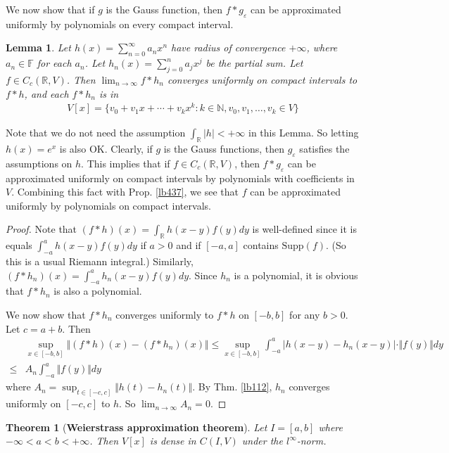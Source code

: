 \documentclass[12pt,b5paper,notitlepage]{article}
\theoremstyle{definition}
\theoremstyle{plain}
\newtheorem{thm}[df]{Theorem}
\newtheorem{lm}[df]{Lemma}
\newcommand{\Nbb}{\mathbb N}
\newcommand{\Rbb}{\mathbb R}
\newcommand{\Supp}{\mathrm{Supp}}
\newcommand{\Fbb}{\mathbb F}
\newcommand{\eps}{\varepsilon}
\numberwithin{equation}{section}
\begin{document}
We now show that if $g$ is the Gauss function, then $f*g_\eps$ can be approximated uniformly by polynomials on every compact interval. 

\begin{lm}\label{lb438}
Let $h(x)=\sum_{n=0}^\infty a_nx^n$ have radius of convergence $+\infty$, where $a_n\in\Fbb$ for each $a_n$. Let $h_n(x)=\sum_{j=0}^n a_jx^j$ be the partial sum. Let $f\in C_c(\Rbb,V)$. Then $\lim_{n\rightarrow\infty}f*h_n$ converges uniformly on compact intervals to $f*h$, and each $f*h_n$ is in 
\begin{align}
V[x]=\{v_0+v_1x+\cdots+v_kx^k:k\in\Nbb,v_0,v_1,\dots,v_k\in V\}
\end{align}
\end{lm}

Note that we do not need the assumption $\int_\Rbb |h|<+\infty$ in this Lemma. So letting $h(x)=e^x$ is also OK. Clearly, if $g$ is the Gauss functions, then $g_\eps$ satisfies the assumptions on $h$. This implies that if $f\in C_c(\Rbb,V)$, then $f*g_\eps$ can be approximated uniformly on compact intervals by  polynomials with coefficients in $V$. Combining this fact with Prop. \ref{lb437}, we see that $f$ can be approximated uniformly by polynomials on compact intervals.

\begin{proof}
Note that $(f*h)(x)=\int_\Rbb h(x-y)f(y)dy$ is well-defined since it is equals $\int_{-a}^a h(x-y)f(y)dy$ if $a>0$ and if $[-a,a]$ contains $\Supp(f)$. (So this is a usual Riemann integral.) Similarly, $(f*h_n)(x)=\int_{-a}^a h_n(x-y)f(y)dy$. Since $h_n$ is a polynomial, it is obvious that $f*h_n$ is also a polynomial.

We now show that $f*h_n$ converges uniformly to $f*h$ on $[-b,b]$ for any $b>0$. Let $c=a+b$. Then 
\begin{align*}
&\sup_{x\in[-b,b]}\Vert (f*h)(x)-(f*h_n)(x)\Vert\leq\sup_{x\in[-b,b]}\int_{-a}^a |h(x-y)-h_n(x-y)|\cdot\Vert f(y)\Vert dy\\
\leq&A_n\int_{-a}^a\Vert f(y)\Vert dy
\end{align*}
where $A_n=\sup_{t\in[-c,c]}\Vert h(t)-h_n(t)\Vert$. By Thm. \ref{lb112}, $h_n$ converges uniformly on $[-c,c]$ to $h$. So $\lim_{n\rightarrow\infty}A_n=0$.
\end{proof}


\begin{thm}[\textbf{Weierstrass approximation theorem}]  \label{lb441}
Let $I=[a,b]$ where $-\infty<a<b<+\infty$. Then $V[x]$ is dense in $C(I,V)$ under the $l^\infty$-norm.
\end{thm}
\end{document}
